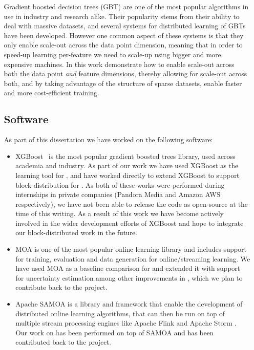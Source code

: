 \begin{itemize}
	Gradient boosted decision trees (GBT) are one of the most popular algorithms in
	use in industry and research alike. Their popularity stems from their ability
	to deal with massive datasets, and several systems for distributed learning
	of GBTs have been developed. However one common aspect of these systems is that
	they only enable scale-out across the data point dimension, meaning that in
	order to speed-up learning per-feature we need to scale-up using bigger and more
	expensive machines. In this work demonstrate how to enable scale-out across
	both the data point \emph{and} feature dimensions, thereby allowing for scale-out
	across both, and by taking advantage of the structure of sparse datasets,
	enable faster and more cost-efficient training.
\end{itemize}

\subsection{Software}

As part of this dissertation we have worked on the following software:

\begin{itemize}
	\item XGBoost~\cite{xgboost} is the most popular gradient boosted trees library,
	used across academia and industry. As part of our work we have used XGBoost as the
	learning tool for \sessionlength, and have worked directly to extend XGBoost to
	support block-distribution
	for \blockgbt. As both of these works were performed during internships in private
	companies (Pandora Media and Amazon AWS respectively), we have not been able to release
	the code as open-source at the time of this writing.
	As a result of this work we have become actively involved in the wider
	development efforts of XGBoost and hope to integrate our block-distributed
	work in the future.
	\item MOA \cite{moa-book} is one of the most popular online learning library and includes
	support for training, evaluation and data generation for online/streaming learning.
	We have used MOA as a baseline comparison for \boostvht and extended it with
	support for uncertainty estimation among other improvements in \uncertaintrees,
	which we plan to contribute back to the project.
	\item Apache SAMOA \cite{samoa} is a library and framework that enable the development
	of distributed online learning algorithms, that can then be run on top of multiple
	stream processing engines like Apache Flink \cite{flink} and Apache Storm \cite{storm}.
	Our work on \boostvht has been performed on top of SAMOA and has been contributed back
	to the project.
\end{itemize}

